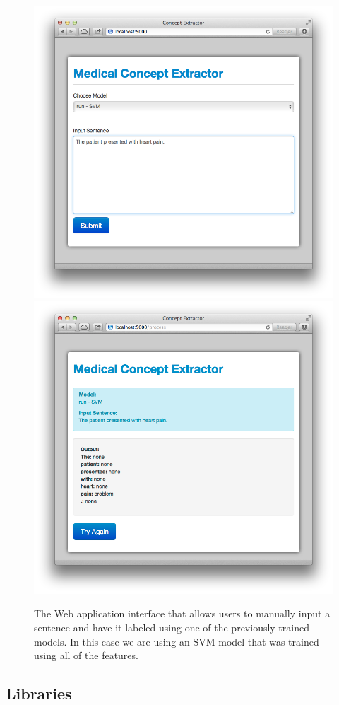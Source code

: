 \documentclass[preprint]{style}
\begin{document}
\begin{figure}[t]
\begin{center}
	\includegraphics[width=0.75\columnwidth]{figures/web-interface-1.png}
	\includegraphics[width=0.75\columnwidth]{figures/web-interface-2.png}
\end{center}
\caption{The Web application interface that allows users to manually input a sentence and have it labeled using one of the previously-trained models. In this case we are using an SVM model that was trained using all of the features.}
\label{fig:web_interface}
\end{figure}


\subsection{Libraries}
\end{document}
